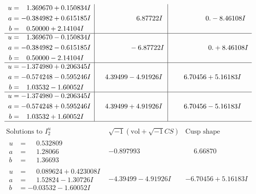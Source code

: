 \documentclass[1p]{elsarticle_modified}
\theoremstyle{definition}
\newcommand{\I}{\sqrt{-1}}
\begin{document}
$$\begin{array}{c|c|c}
\begin{aligned}
u &= \phantom{-}1.369670 + 0.150834 I \\
a &= -0.384982 + 0.615185 I \\
b &= \phantom{-}0.50000 + 2.14104 I\end{aligned}
 & \phantom{-0.000000 -}6.87722 I & \phantom{-0.000000 } 0. - 8.46108 I \\ \hline\begin{aligned}
u &= \phantom{-}1.369670 - 0.150834 I \\
a &= -0.384982 - 0.615185 I \\
b &= \phantom{-}0.50000 - 2.14104 I\end{aligned}
 & \phantom{-0.000000 } -6.87722 I & \phantom{-0.000000 -}0. + 8.46108 I \\ \hline\begin{aligned}
u &= -1.374980 + 0.206345 I \\
a &= -0.574248 - 0.595246 I \\
b &= \phantom{-}1.03532 - 1.60052 I\end{aligned}
 & \phantom{-}4.39499 - 4.91926 I & \phantom{-}6.70456 + 5.16183 I \\ \hline\begin{aligned}
u &= -1.374980 - 0.206345 I \\
a &= -0.574248 + 0.595246 I \\
b &= \phantom{-}1.03532 + 1.60052 I\end{aligned}
 & \phantom{-}4.39499 + 4.91926 I & \phantom{-}6.70456 - 5.16183 I\\
 \hline 
 \end{array}$$\newpage$$\begin{array}{c|c|c}  
\text{Solutions to }I^u_{2}& \I (\text{vol} + \sqrt{-1}CS) & \text{Cusp shape}\\
 \hline 
\begin{aligned}
u &= \phantom{-}0.532809\phantom{ +0.000000I} \\
a &= \phantom{-}1.28066\phantom{ +0.000000I} \\
b &= \phantom{-}1.36693\phantom{ +0.000000I}\end{aligned}
 & -0.897993\phantom{ +0.000000I} & \phantom{-}6.66870\phantom{ +0.000000I} \\ \hline\begin{aligned}
u &= \phantom{-}0.089624 + 0.423008 I \\
a &= \phantom{-}1.52824 - 1.30726 I \\
b &= -0.03532 - 1.60052 I\end{aligned}
 & -4.39499 - 4.91926 I & -6.70456 + 5.16183 I \\ \hline\begin{aligned}

\end{aligned}
\end{array}$$
\end{document}

